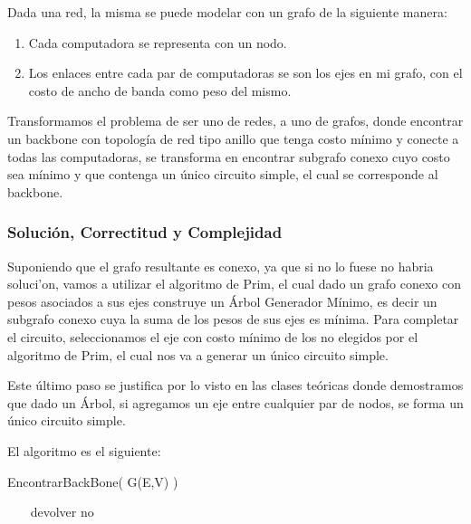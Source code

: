 Dada una red, la misma se puede modelar con un grafo de la siguiente manera:

\begin{enumerate}
	\item Cada computadora se representa con un nodo.
	\item Los enlaces entre cada par de computadoras se son los ejes en mi grafo, con el costo de ancho de banda como peso del mismo.
\end{enumerate}

Transformamos el problema de ser uno de redes, a uno de grafos, donde encontrar un backbone con topología de red tipo anillo que tenga costo mínimo y conecte a todas las computadoras, se transforma en encontrar subgrafo conexo cuyo costo sea mínimo y que contenga un único circuito simple, el cual se corresponde al backbone.

\subsubsection{Solución, Correctitud y Complejidad}

Suponiendo que el grafo resultante es conexo, ya que si no lo fuese no habria soluci'on, vamos a utilizar el algoritmo de Prim, el cual dado un grafo conexo con pesos asociados a sus ejes construye un Árbol Generador Mínimo, es decir un subgrafo conexo cuya la suma de los pesos de sus ejes es mínima. Para completar el circuito, seleccionamos el eje con costo mínimo de los no elegidos por el algoritmo de Prim, el cual nos va a generar un único circuito simple.

Este último paso se justifica por lo visto en las clases teóricas donde demostramos que dado un Árbol, si agregamos un eje entre cualquier par de nodos, se forma un único circuito simple.

El algoritmo es el siguiente:

\begin{algorithm}
\begin{algorithmic}[1]\parskip=1mm
\caption{EncontrarBackBone( G(E,V) ) }
	\STATE ~~~{ devolver no}
 \end{algorithmic}
\end{algorithm}

